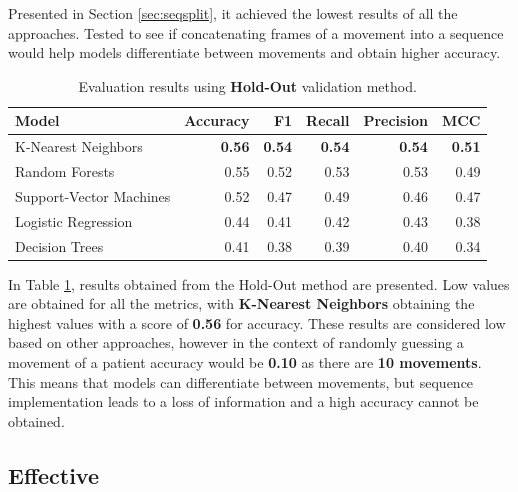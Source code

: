                Presented in Section \ref{sec:seqsplit}, it achieved the lowest results of all the approaches. Tested to see if concatenating frames of a movement into a sequence would help models differentiate between movements and obtain higher accuracy. 
                
                \begin{table}[htbp]
                    \centering
                    \begin{tabular}{lrrrrr}
                        \toprule
                        \textbf{Model} & \textbf{Accuracy} & \textbf{F1} & \textbf{Recall} & \textbf{Precision} & \textbf{MCC} \\
                        \midrule
                        K-Nearest Neighbors & \textbf{0.56} & \textbf{0.54} & \textbf{0.54} & \textbf{0.54} & \textbf{0.51} \\
                        Random Forests & 0.55 & 0.52 & 0.53 & 0.53 & 0.49 \\
                        Support-Vector Machines& 0.52 & 0.47 & 0.49 & 0.46 & 0.47 \\
                        Logistic Regression & 0.44 & 0.41 & 0.42 & 0.43 & 0.38 \\
                        Decision Trees & 0.41 & 0.38 & 0.39 & 0.40 & 0.34 \\
                        \bottomrule
                    \end{tabular}
                    \caption{Evaluation results using \textbf{Hold-Out} validation method.}
                    \label{tab:sequence_approach_holdout}
                \end{table}

                In Table \ref{tab:sequence_approach_holdout}, results obtained from the Hold-Out method are presented. Low values are obtained for all the metrics, with \textbf{K-Nearest Neighbors} obtaining the highest values with a score of \textbf{0.56} for accuracy. These results are considered low based on other approaches, however in the context of randomly guessing a movement of a patient accuracy would be \textbf{0.10} as there are \textbf{10 movements}. This means that models can differentiate between movements, but sequence implementation leads to a loss of information and a high accuracy cannot be obtained.

        \subsection{Effective}

